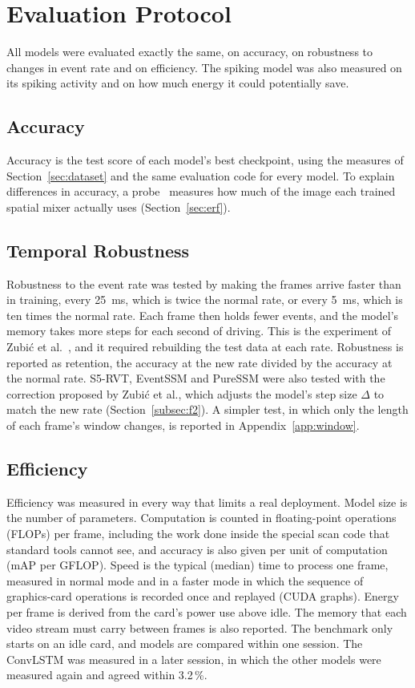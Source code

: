 \documentclass[11pt, a4paper]{report}
\begin{document}
\section{Evaluation Protocol}
\label{sec:eval_protocol}
All models were evaluated exactly the same, on accuracy, on robustness to changes in event rate and on
efficiency. The spiking model was also measured on its spiking activity and on how much energy it could
potentially save.

\subsection{Accuracy}
\label{subsec:eval_acc}
Accuracy is the test score of each model's best checkpoint, using the measures of Section~\ref{sec:dataset}
and the same evaluation code for every model. To explain differences in accuracy, a
probe~\cite{luo2016understanding} measures how much of the image each trained spatial mixer actually uses
(Section~\ref{sec:erf}).

\subsection{Temporal Robustness}
\label{subsec:eval_rob}
Robustness to the event rate was tested by making the frames arrive faster than in training, every 25~ms,
which is twice the normal rate, or every 5~ms, which is ten times the normal rate. Each frame then holds
fewer events, and the model's memory takes more steps for each second of driving. This is the experiment of
Zubi\'{c} et al.~\cite{zubic2024state}, and it required rebuilding the test data at each rate. Robustness is
reported as retention, the accuracy at the new rate divided by the accuracy at the normal rate. S5-RVT,
EventSSM and PureSSM were also tested with the correction proposed by Zubi\'{c} et al., which adjusts the
model's step size $\Delta$ to match the new rate (Section~\ref{subsec:f2}). A simpler test, in which only
the length of each frame's window changes, is reported in Appendix~\ref{app:window}.

\subsection{Efficiency}
\label{subsec:eval_eff}
Efficiency was measured in every way that limits a real deployment. Model size is the number of
parameters. Computation is counted in floating-point operations (FLOPs) per frame, including the work done
inside the special scan code that standard tools cannot see, and accuracy is also given per unit of
computation (mAP per GFLOP). Speed is the typical (median) time to process one frame, measured in normal
mode and in a faster mode in which the sequence of graphics-card operations is recorded once and replayed
(CUDA graphs). Energy per frame is derived from the card's power use above idle. The memory that each video
stream must carry between frames is also reported. The benchmark only starts on an idle card, and models
are compared within one session. The ConvLSTM was measured in a later session, in which the other models
were measured again and agreed within 3.2\,\%.
\end{document}
